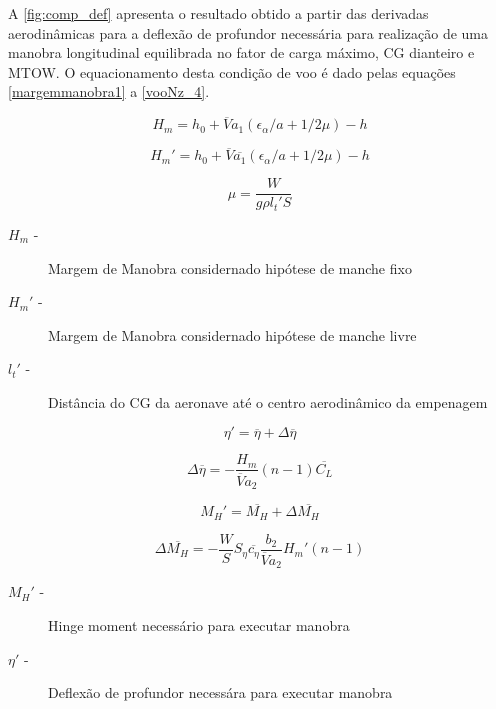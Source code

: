 A \autoref{fig:comp_def} apresenta o resultado obtido a partir das derivadas aerodinâmicas para a deflexão de profundor necessária para realização de uma manobra longitudinal equilibrada no fator de carga máximo, CG dianteiro e MTOW. O equacionamento desta condição de voo é dado pelas equações \ref{margemmanobra1} a \ref{vooNz_4}.

\begin{equation}
\label{margemmanobra1}
H_m = h_0 + \overline{V} a_1 (\epsilon_{\alpha}/a + 1/2 \mu) - h
\end{equation}

\begin{equation}
\label{margemmanobra2}
H_m' = h_0 + \overline{V} \overline{a_1} (\epsilon_{\alpha}/a + 1/2 \mu) - h
\end{equation}

\begin{equation}
\label{margemmanobra3}
\mu = \frac{W}{g \rho l_t' S}
\end{equation}

\begin{description}
\item[$H_m$ -] Margem de Manobra considernado hipótese de manche fixo
\item[$H_m'$ -] Margem de Manobra considernado hipótese de manche livre
\item[$l_t'$ -] Distância do CG da aeronave até o centro aerodinâmico da empenagem
\end{description}

\begin{equation}
\label{vooNz_1}
\eta' = \overline{\eta} + \Delta\overline{\eta}
\end{equation}

\begin{equation}
\label{vooNz_2}
\Delta\overline{\eta} = - \frac{H_m}{\overline{V} a_2} (n - 1) \overline{C_L}
\end{equation}

\begin{equation}
\label{vooNz_3}
M_H' = \overline{M_H} + \Delta\overline{M_H}
\end{equation}

\begin{equation}
\label{vooNz_4}
\Delta\overline{M_H} = - \frac{W}{S} S_{\eta} \overline{c_{\eta}} \frac{b_2}{\overline{V} a_2} H_m' (n-1)
\end{equation}

\begin{description}
\item[$M_H'$ -] Hinge moment necessário para executar manobra
\item[$\eta'$ -] Deflexão de profundor necessára para executar manobra
\end{description}

